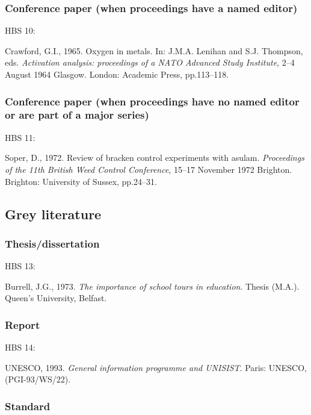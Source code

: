 \subsubsection*{Conference paper (when proceedings have a named editor)}

HBS 10: \cite{crawford1965oim}

Crawford, G.I., 1965. Oxygen in metals. In: J.M.A. Lenihan and S.J. Thompson, eds. \emph{Activation analysis: proceedings of a NATO Advanced Study Institute}, 2--4 August 1964 Glasgow. London: Academic Press, pp.113--118.



\subsubsection*{Conference paper (when proceedings have no named editor or are part of a major series)}

HBS 11: \cite{soper1972rbc}

Soper, D., 1972. Review of bracken control experiments with asulam. \emph{Proceedings of the 11th British Weed Control Conference}, 15--17 November 1972 Brighton. Brighton: University of Sussex, pp.24--31.



\subsection{Grey literature}

\subsubsection*{Thesis/dissertation}

HBS 13: \cite{burrell1973ist}

Burrell, J.G., 1973. \emph{The importance of school tours in education}. Thesis (M.A.). Queen's University, Belfast.



\subsubsection*{Report}

HBS 14: \cite{unesco1993gip}

UNESCO, 1993. \emph{General information programme and UNISIST}. Paris: UNESCO, (PGI-93/WS/22).



\subsubsection*{Standard}

